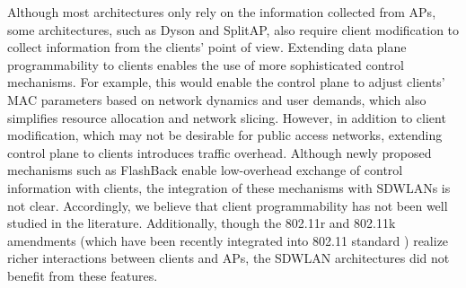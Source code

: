 Although most architectures only rely on the information collected from APs, some architectures, such as Dyson and SplitAP, also require client modification to collect information from the clients' point of view.
Extending data plane programmability to clients enables the use of more sophisticated control mechanisms.
For example, this would enable the control plane to adjust clients' MAC parameters based on network dynamics and user demands, which also simplifies resource allocation and network slicing.
However, in addition to client modification, which may not be desirable for public access networks, extending control plane to clients introduces traffic overhead.
Although newly proposed mechanisms such as FlashBack \cite{FlashBack} enable low-overhead exchange of control information with clients, the integration of these mechanisms with SDWLANs is not clear. 
Accordingly, we believe that client programmability has not been well studied in the literature.
Additionally, though the 802.11r and 802.11k amendments (which have been recently integrated into 802.11 standard \cite{802.11_2016}) realize richer interactions between clients and APs, the SDWLAN architectures did not benefit from these features.











